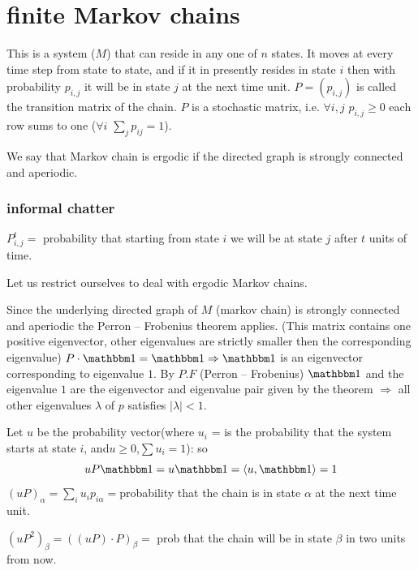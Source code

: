 \section{finite Markov chains}

This is a system ($M$) that can reside in any one of $n$ states.
It moves at every time step from state to state, and if it in presently
resides in state $i$ then with probability $p_{i,j}$ it will be
in state $j$ at the next time unit. $P=\left(p_{i,j}\right)$ is
called the transition matrix of the chain. $P$ is a stochastic matrix,
i.e. $\forall i,j$ $p_{i,j}\ge0$ each row sums to one ($\forall i\,\,\sum_{j}p_{ij}=1$).
\begin{definition}
We say that Markov chain is ergodic if the directed graph is strongly
connected and aperiodic.
\end{definition}


\subsubsection{informal chatter}

$P_{i,j}^{t}=$ probability that starting from state $i$ we will
be at state $j$ after $t$ units of time.

Let us restrict ourselves to deal with ergodic Markov chains.

Since the underlying directed graph of $M$ (markov chain) is strongly
connected and aperiodic the Perron -- Frobenius theorem applies.
(This matrix contains one positive eigenvector, other eigenvalues
are strictly smaller then the corresponding eigenvalue) $P\cdot\one=\one\Rightarrow\one$
is an eigenvector corresponding to eigenvalue $1$. By $P.F$ (Perron
-- Frobenius) $\one$ and the eigenvalue $1$ are the eigenvector
and eigenvalue pair given by the theorem $\Rightarrow$ all other
eigenvalues $\lambda$ of $p$ satisfies $\left|\lambda\right|<1$.

Let $u$ be the probability vector(where $u_{i}$ = is the probability
that the system starts at state $i$, and$u\ge0$,$\sum u_{i}=1$):
so 
\[
uP\one=u\one=\left\langle u,\one\right\rangle =1
\]
$\left(uP\right)_{\alpha}=\sum_{i}u_{i}p_{i\alpha}=$probability that
the chain is in state $\alpha$ at the next time unit.

$\left(uP^{2}\right)_{\beta}=\left(\left(uP\right)\cdot P\right)_{\beta}=$
prob that the chain will be in state $\beta$ in two units from now.

